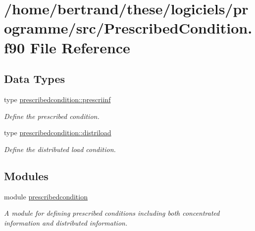 \hypertarget{_prescribed_condition_8f90}{}\section{/home/bertrand/these/logiciels/programme/src/\+Prescribed\+Condition.f90 File Reference}
\label{_prescribed_condition_8f90}
\subsection*{Data Types}
\begin{DoxyCompactItemize}
\item 
type \hyperlink{structprescribedcondition_1_1prescriinf}{prescribedcondition\+::prescriinf}
\begin{DoxyCompactList}\small\item\em Define the prescribed condition. \end{DoxyCompactList}\item 
type \hyperlink{structprescribedcondition_1_1distriload}{prescribedcondition\+::distriload}
\begin{DoxyCompactList}\small\item\em Define the distributed load condition. \end{DoxyCompactList}\end{DoxyCompactItemize}
\subsection*{Modules}
\begin{DoxyCompactItemize}
\item 
module \hyperlink{namespaceprescribedcondition}{prescribedcondition}
\begin{DoxyCompactList}\small\item\em A module for defining prescribed conditions including both concentrated information and distributed information. \end{DoxyCompactList}\end{DoxyCompactItemize}

